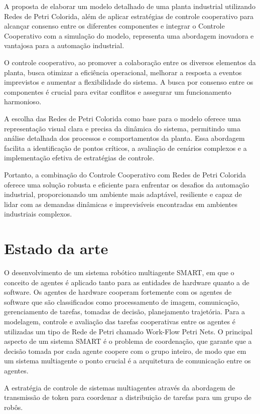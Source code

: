 A proposta de elaborar um modelo detalhado de uma planta industrial utilizando Redes de Petri Colorida, além de aplicar estratégias de controle cooperativo para alcançar consenso entre os diferentes componentes e integrar o Controle Cooperativo com a simulação do modelo, representa uma abordagem inovadora e vantajosa para a automação industrial.

O controle cooperativo, ao promover a colaboração entre os diversos elementos da planta, busca otimizar a eficiência operacional, melhorar a resposta a eventos imprevistos e aumentar a flexibilidade do sistema. A busca por consenso entre os componentes é crucial para evitar conflitos e assegurar um funcionamento harmonioso.

A escolha das Redes de Petri Colorida como base para o modelo oferece uma representação visual clara e precisa da dinâmica do sistema, permitindo uma análise detalhada dos processos e comportamentos da planta. Essa abordagem facilita a identificação de pontos críticos, a avaliação de cenários complexos e a implementação efetiva de estratégias de controle.

Portanto, a combinação do Controle Cooperativo com Redes de Petri Colorida oferece uma solução robusta e eficiente para enfrentar os desafios da automação industrial, proporcionando um ambiente mais adaptável, resiliente e capaz de lidar com as demandas dinâmicas e imprevisíveis encontradas em ambientes industriais complexos.


\section{Estado da arte}
O desenvolvimento de um sistema robótico multiagente SMART, em que o conceito de agentes é aplicado tanto para as entidades de hardware quanto a de software.  Os agentes de hardware cooperam fortemente com os agentes de software que são classificados como processamento de imagem, comunicação, gerenciamento de tarefas, tomadas de decisão, planejamento trajetória. Para a modelagem, controle e avaliação das tarefas cooperativas entre os agentes é utilizadas um tipo de Rede de Petri chamado Work-Flow Petri Nets. O principal aspecto de um sistema SMART é o problema de coordenação, que garante que a decisão tomada por cada agente coopere com o grupo inteiro, de modo que em um sistema multiagente o ponto crucial é a arquitetura de comunicação entre os agentes. \cite{smart2013}

A estratégia de controle de sistemas multiagentes através da abordagem de transmissão de token para coordenar a distribuição de tarefas para um grupo de robôs. \cite{token2006} 

